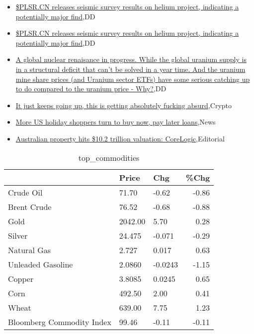 \documentclass{article}%
\begin{document}
%
\begin{itemize}%
\item%
\href{https://reddit.com/r/Baystreetbets/comments/18bg5gt/plsrcn\_releases\_seismic\_survey\_results\_on\_helium/}{\$PLSR.CN releases seismic survey results on helium project, indicating a potentially major find},DD%
\item%
\href{https://reddit.com/r/Baystreetbets/comments/18bg5go/plsrcn\_releases\_seismic\_survey\_results\_on\_helium/}{\$PLSR.CN releases seismic survey results on helium project, indicating a potentially major find},DD%
\item%
\href{https://reddit.com/r/Baystreetbets/comments/18bcb6b/a\_global\_nuclear\_renaisance\_in\_progress\_while\_the/}{A global nuclear renaisance in progress. While the global uranium supply is in a structural deficit that can't be solved in a year time. And the uranium mine share prices (and Uranium sector ETFs) have some serious catching up to do compared to the uranium price - Why?},DD%
\item%
\href{https://reddit.com/r/StockMarket/comments/18bodok/it\_just\_keeps\_going\_up\_this\_is\_getting\_absolutely/}{It just keeps going up, this is getting absolutely fucking absurd},Crypto%
\item%
\href{https://reddit.com/r/Economics/comments/18bqjlw/more\_us\_holiday\_shoppers\_turn\_to\_buy\_now\_pay/}{More US holiday shoppers turn to buy now, pay later loans},News%
\item%
\href{https://reddit.com/r/Economics/comments/18bpju1/australian\_property\_hits\_102\_trillion\_valuation/}{Australian property hits \$10.2 trillion valuation: CoreLogic},Editorial%
\end{itemize}%


\begin{table}[htbp]%
\caption{top\_commodities}%
\centering%
\begin{adjustbox}{width=1\textwidth}%
\begin{tabular}{lllr}
\toprule
                          &   Price &     Chg &  \%Chg \\
\midrule
               Crude Oil  &   71.70 &   -0.62 & -0.86 \\
             Brent Crude  &   76.52 &   -0.68 & -0.88 \\
                    Gold  & 2042.00 &    5.70 &  0.28 \\
                  Silver  &  24.475 &  -0.071 & -0.29 \\
             Natural Gas  &   2.727 &   0.017 &  0.63 \\
       Unleaded Gasoline  &  2.0860 & -0.0243 & -1.15 \\
                  Copper  &  3.8085 &  0.0245 &  0.65 \\
                    Corn  &  492.50 &    2.00 &  0.41 \\
                   Wheat  &  639.00 &    7.75 &  1.23 \\
Bloomberg Commodity Index &   99.46 &   -0.11 & -0.11 \\
\bottomrule
\end{tabular}
%
\end{adjustbox}%
\end{table}
\end{document}
